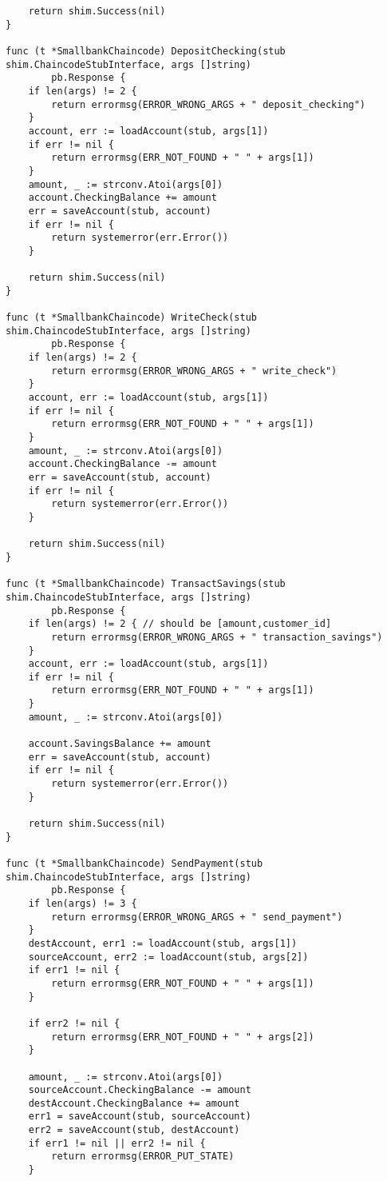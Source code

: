 \begin{lstlisting}
	return shim.Success(nil)
}

func (t *SmallbankChaincode) DepositChecking(stub shim.ChaincodeStubInterface, args []string) 
        pb.Response {
	if len(args) != 2 { 
		return errormsg(ERROR_WRONG_ARGS + " deposit_checking")
	}
	account, err := loadAccount(stub, args[1])
	if err != nil {
		return errormsg(ERR_NOT_FOUND + " " + args[1])
	}
	amount, _ := strconv.Atoi(args[0])
	account.CheckingBalance += amount
	err = saveAccount(stub, account)
	if err != nil {
		return systemerror(err.Error())
	}

	return shim.Success(nil)
}

func (t *SmallbankChaincode) WriteCheck(stub shim.ChaincodeStubInterface, args []string) 
        pb.Response {
	if len(args) != 2 { 
		return errormsg(ERROR_WRONG_ARGS + " write_check")
	}
	account, err := loadAccount(stub, args[1])
	if err != nil {
		return errormsg(ERR_NOT_FOUND + " " + args[1])
	}
	amount, _ := strconv.Atoi(args[0])
	account.CheckingBalance -= amount
	err = saveAccount(stub, account)
	if err != nil {
		return systemerror(err.Error())
	}

	return shim.Success(nil)
}

func (t *SmallbankChaincode) TransactSavings(stub shim.ChaincodeStubInterface, args []string) 
        pb.Response {
	if len(args) != 2 { // should be [amount,customer_id]
		return errormsg(ERROR_WRONG_ARGS + " transaction_savings")
	}
	account, err := loadAccount(stub, args[1])
	if err != nil {
		return errormsg(ERR_NOT_FOUND + " " + args[1])
	}
    amount, _ := strconv.Atoi(args[0])

	account.SavingsBalance += amount
	err = saveAccount(stub, account)
	if err != nil {
		return systemerror(err.Error())
	}

	return shim.Success(nil)
}

func (t *SmallbankChaincode) SendPayment(stub shim.ChaincodeStubInterface, args []string) 
        pb.Response {
	if len(args) != 3 { 
		return errormsg(ERROR_WRONG_ARGS + " send_payment")
	}
	destAccount, err1 := loadAccount(stub, args[1])
	sourceAccount, err2 := loadAccount(stub, args[2])
	if err1 != nil {
		return errormsg(ERR_NOT_FOUND + " " + args[1])
	}

	if err2 != nil {
		return errormsg(ERR_NOT_FOUND + " " + args[2])
	}

	amount, _ := strconv.Atoi(args[0])
	sourceAccount.CheckingBalance -= amount
	destAccount.CheckingBalance += amount
	err1 = saveAccount(stub, sourceAccount)
	err2 = saveAccount(stub, destAccount)
	if err1 != nil || err2 != nil {
		return errormsg(ERROR_PUT_STATE)
	}


\end{lstlisting}
